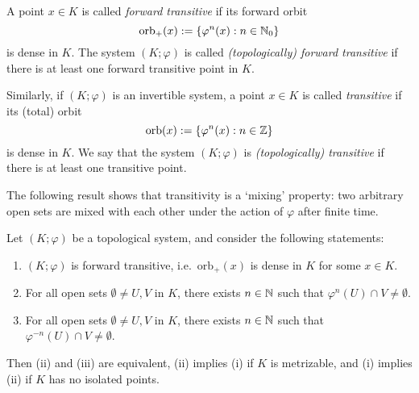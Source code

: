 \begin{definition}
	A point $x\in K$ is called \emph{forward transitive} if its forward orbit
	\begin{equation*}
		\mathrm{orb}_+(x) := \{\varphi^n(x) : n\in\mathbb{N}_0\}
	\end{equation*}
	is dense in $K$. The system $(K;\varphi)$ is called \emph{(topologically) forward transitive} if there is at least one forward transitive point in $K$.
	
	Similarly, if $(K;\varphi)$ is an invertible system, a point $x\in K$ is called \emph{transitive} if its (total) orbit
	\begin{equation*}
		\mathrm{orb}(x) := \{\varphi^n(x) : n\in\mathbb{Z}\}
	\end{equation*}
	is dense in $K$. We say that the system $(K;\varphi)$ is \emph{(topologically) transitive} if there is at least one transitive point.
\end{definition}
The following result shows that transitivity is a `mixing' property: two arbitrary open sets are mixed with each other under the action of $\varphi$ after finite time.

\begin{proposition}
	Let $(K;\varphi)$ be a topological system, and consider the following statements:
	\begin{enumerate}[\upshape (i)]
		\item $(K;\varphi)$ is forward transitive, i.e.\ $\mathrm{orb}_+(x)$ is dense in $K$ for some $x\in K$.
		\item For all open sets $\emptyset\ne U, V$ in $K$, there exists $n\in\mathbb{N}$ such that $\varphi^n(U)\cap V \ne \emptyset$.
		\item For all open sets $\emptyset\ne U, V$ in $K$, there exists $n\in\mathbb{N}$ such that $\varphi^{-n}(U)\cap V \ne \emptyset$.
	\end{enumerate}
	Then (ii) and (iii) are equivalent, (ii) implies (i) if $K$ is metrizable, and (i) implies (ii) if $K$ has no isolated points.
\end{proposition}

